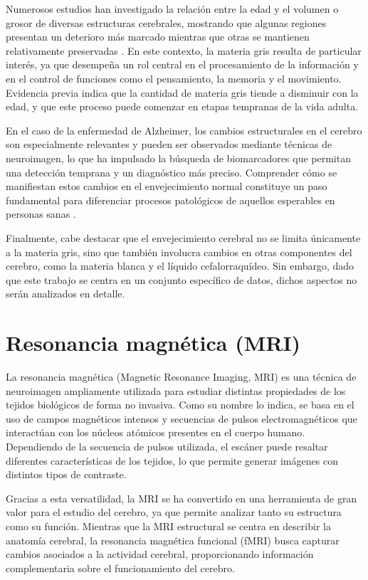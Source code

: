 Numerosos estudios han investigado la relación entre la edad y el volumen o grosor de diversas estructuras cerebrales, mostrando que algunas regiones presentan un deterioro más marcado mientras que otras se mantienen relativamente preservadas \cite{good2001voxel}. En este contexto, la materia gris resulta de particular interés, ya que desempeña un rol central en el procesamiento de la información y en el control de funciones como el pensamiento, la memoria y el movimiento. Evidencia previa indica que la cantidad de materia gris tiende a disminuir con la edad, y que este proceso puede comenzar en etapas tempranas de la vida adulta.

En el caso de la enfermedad de Alzheimer, los cambios estructurales en el cerebro son especialmente relevantes y pueden ser observados mediante técnicas de neuroimagen, lo que ha impulsado la búsqueda de biomarcadores que permitan una detección temprana y un diagnóstico más preciso. Comprender cómo se manifiestan estos cambios en el envejecimiento normal constituye un paso fundamental para diferenciar procesos patológicos de aquellos esperables en personas sanas \cite{fjell2010structural}.

Finalmente, cabe destacar que el envejecimiento cerebral no se limita únicamente a la materia gris, sino que también involucra cambios en otras componentes del cerebro, como la materia blanca y el líquido cefalorraquídeo. Sin embargo, dado que este trabajo se centra en un conjunto específico de datos, dichos aspectos no serán analizados en detalle.

\section{Resonancia magnética (MRI)}
\label{sec:mri}

La resonancia magnética (Magnetic Resonance Imaging, MRI) es una técnica de neuroimagen ampliamente utilizada para estudiar distintas propiedades de los tejidos biológicos de forma no invasiva. Como su nombre lo indica, se basa en el uso de campos magnéticos intensos y secuencias de pulsos electromagnéticos que interactúan con los núcleos atómicos presentes en el cuerpo humano. Dependiendo de la secuencia de pulsos utilizada, el escáner puede resaltar diferentes características de los tejidos, lo que permite generar imágenes con distintos tipos de contraste.

Gracias a esta versatilidad, la MRI se ha convertido en una herramienta de gran valor para el estudio del cerebro, ya que permite analizar tanto su estructura como su función. Mientras que la MRI estructural se centra en describir la anatomía cerebral, la resonancia magnética funcional (fMRI) busca capturar cambios asociados a la actividad cerebral, proporcionando información complementaria sobre el funcionamiento del cerebro.

